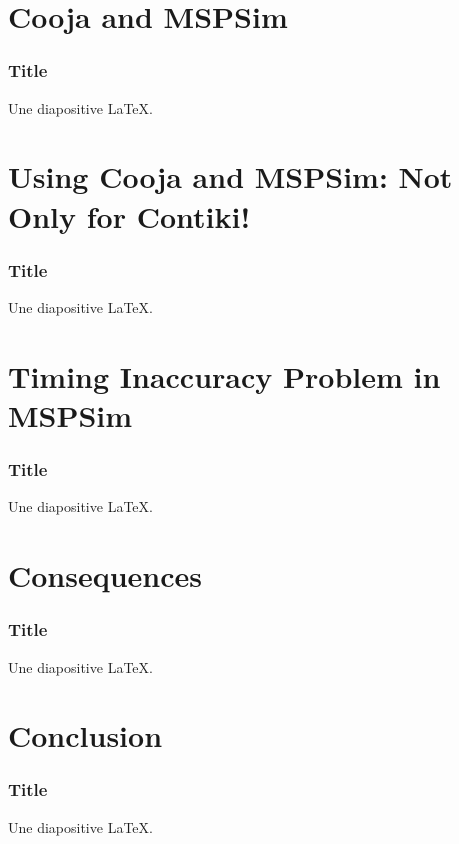 \documentclass[10pt,c]{beamer}
\begin{document}

\section{Cooja and MSPSim}

\begin{frame}
\frametitle{Title}
Une diapositive \LaTeX.
\end{frame}


\section{Using Cooja and MSPSim: Not Only for Contiki!}

\begin{frame}
\frametitle{Title}
Une diapositive \LaTeX.
\end{frame}


\section{Timing Inaccuracy Problem in MSPSim}

\begin{frame}
\frametitle{Title}
Une diapositive \LaTeX.
\end{frame}


\section{Consequences}

\begin{frame}
\frametitle{Title}
Une diapositive \LaTeX.
\end{frame}


\section{Conclusion}

\begin{frame}
\frametitle{Title}
Une diapositive \LaTeX.
\end{frame}
\end{document}
